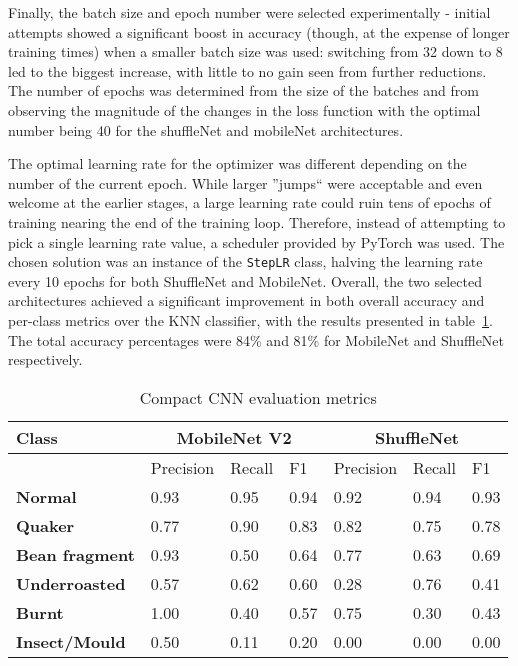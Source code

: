 Finally, the batch size and epoch number were selected experimentally - initial attempts showed a significant boost in accuracy
(though, at the expense of longer training times) when a smaller batch size was used: switching from 32 down to 8 led
to the biggest increase, with little to no gain seen from further reductions.
The number of epochs was determined from the size of the batches and from observing the magnitude of the changes in the loss function
with the optimal number being 40 for the shuffleNet and mobileNet architectures.

The optimal learning rate for the optimizer was different depending on the number of the current epoch.
While larger ''jumps`` were acceptable and even welcome at the earlier stages, a large learning rate could ruin tens of epochs
of training nearing the end of the training loop.
Therefore, instead of attempting to pick a single learning rate value, a scheduler provided by PyTorch was used.
The chosen solution was an instance of the \verb|StepLR| class, halving the learning rate every 10 epochs for both
ShuffleNet and MobileNet.
Overall, the two selected architectures achieved a significant improvement in both overall accuracy and per-class
metrics over the KNN classifier, with the results presented in table~\ref{tab:cnn-small-scores}.
The total accuracy percentages were 84\% and 81\% for MobileNet and ShuffleNet respectively.

\begin{table}
    \centering
    \begin{tabular}{*7l}
        \toprule
        \textbf{Class} & \multicolumn{3}{c}{MobileNet V2} & \multicolumn{3}{c}{ShuffleNet} \\
        \midrule
        {} & Precision & Recall & F1 & Precision & Recall & F1 \\
        \textbf{Normal} & 0.93 & 0.95 & 0.94 & 0.92 & 0.94 & 0.93  \\
        \textbf{Quaker} & 0.77 & 0.90 & 0.83 & 0.82 & 0.75 & 0.78 \\
        \textbf{Bean fragment} & 0.93 & 0.50 & 0.64 & 0.77 & 0.63 & 0.69 \\
        \textbf{Underroasted} & 0.57 & 0.62 & 0.60 & 0.28 & 0.76 & 0.41 \\
        \textbf{Burnt} & 1.00 & 0.40 & 0.57 & 0.75 & 0.30 & 0.43 \\
        \textbf{Insect/Mould} & 0.50 & 0.11 & 0.20 & 0.00 & 0.00 & 0.00  \\
        \bottomrule
    \end{tabular}
    \caption{Compact CNN evaluation metrics}
    \label{tab:cnn-small-scores}
\end{table}

